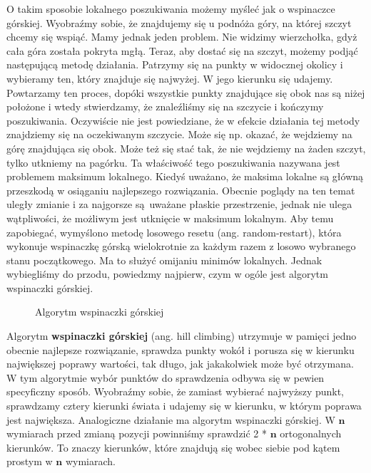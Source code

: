 O takim sposobie lokalnego poszukiwania możemy myśleć jak o wspinaczce górskiej. Wyobraźmy sobie, że znajdujemy się u podnóża góry, na której szczyt chcemy się wspiąć. Mamy jednak jeden problem. Nie widzimy wierzchołka, gdyż cała góra została pokryta mgłą. Teraz, aby dostać się na szczyt, możemy podjąć następującą metodę działania. Patrzymy się na punkty w widocznej okolicy i wybieramy ten, który znajduje się najwyżej. W jego kierunku się udajemy. Powtarzamy ten proces, dopóki wszystkie punkty znajdujące się obok nas są niżej położone i wtedy stwierdzamy, że znaleźliśmy się na szczycie i kończymy poszukiwania. Oczywiście nie jest powiedziane, że w efekcie działania tej metody znajdziemy się na oczekiwanym szczycie. Może się np. okazać, że wejdziemy na górę znajdująca się obok. Może też się stać tak, że nie wejdziemy na żaden szczyt, tylko utkniemy na pagórku. Ta właściwość tego poszukiwania nazywana jest problemem maksimum lokalnego. Kiedyś uważano, że maksima lokalne są główną przeszkodą w osiąganiu najlepszego rozwiązania. Obecnie poglądy na ten temat uległy zmianie i za najgorsze są uważane płaskie przestrzenie, jednak nie ulega wątpliwości, że możliwym jest utknięcie w maksimum lokalnym. Aby temu zapobiegać, wymyślono metodę losowego resetu (ang. random-restart), która wykonuje wspinaczkę górską wielokrotnie za każdym razem z losowo wybranego stanu początkowego. Ma to służyć omijaniu minimów lokalnych. Jednak wybiegliśmy do przodu, powiedzmy najpierw, czym w ogóle jest algorytm wspinaczki górskiej.\newline

\newpage
\begin{figure}[h]

\caption{Algorytm wspinaczki górskiej}
\centering
\end{figure}
\newpage

\noindent Algorytm \textbf{wspinaczki górskiej} (ang. hill climbing) utrzymuje w pamięci jedno obecnie najlepsze rozwiązanie, sprawdza punkty wokół i porusza się w kierunku największej poprawy wartości, tak długo, jak jakakolwiek może być otrzymana. W tym algorytmie wybór punktów do sprawdzenia odbywa się w pewien specyficzny sposób. Wyobraźmy sobie, że zamiast wybierać najwyższy punkt, sprawdzamy cztery kierunki świata i udajemy się w kierunku, w którym poprawa jest największa. Analogiczne działanie ma algorytm wspinaczki górskiej. W $\boldsymbol{n}$ wymiarach przed zmianą pozycji powinniśmy sprawdzić 2 * $\boldsymbol{n}$ ortogonalnych kierunków. To znaczy kierunków, które znajdują się wobec siebie pod kątem prostym w $\boldsymbol{n}$ wymiarach.\newline

